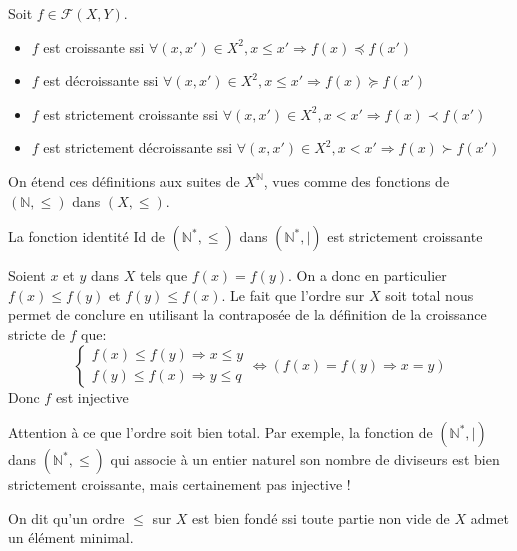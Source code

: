 \documentclass{scrartcl}
\begin{document}
			Soit $f \in \mathcal{F}(X,Y)$. 
			\begin{itemize}
				\item $f$ est croissante ssi $\forall (x,x') \in X^2, x \leq x' \Rightarrow f(x) \preceq f(x')$
				\item $f$ est décroissante ssi $\forall (x,x') \in X^2, x \leq x' \Rightarrow f(x) \succeq f(x')$
				\item $f$ est strictement croissante ssi $\forall (x,x') \in X^2, x < x' \Rightarrow f(x) \prec f(x')$
				\item $f$ est strictement décroissante ssi $\forall (x,x') \in X^2, x < x' \Rightarrow f(x) \succ f(x')$
			\end{itemize}

			\rem On étend ces définitions aux suites de $X^\mathbb{N}$, 
			vues comme des fonctions de $(\mathbb{N},\leq)$ dans $(X,\leq)$.

			\exemple La fonction identité Id de $(\mathbb{N}^*,\leq)$ dans $(\mathbb{N}^*,|)$ est strictement croissante
			
			\begin{demo}
				\item Soient $x$ et $y$ dans $X$ tels que $f(x) = f(y)$.
				On a donc en particulier $f(x) \leq f(y)$ et $f(y) \leq f(x)$. 
				Le fait que l'ordre sur $X$ soit total nous permet de conclure
				en utilisant la contraposée de la définition de la croissance stricte de $f$ que:
				\[
					\begin{cases}
						f(x) \leq f(y) \Rightarrow x \leq y \\
						f(y) \leq f(x) \Rightarrow y \leq q
					\end{cases}
					\Leftrightarrow \left(f(x) = f(y) \Rightarrow x=y \right)
				\]
				Donc $f$ est injective
			\end{demo}

			\rem Attention à ce que l'ordre soit bien total. 
				Par exemple, la fonction de $(\mathbb{N}^*,|)$ dans $(\mathbb{N}^*,\leq)$ 
				qui associe à un entier naturel son nombre de diviseurs est bien strictement croissante,
				mais certainement pas injective !

			On dit qu'un ordre $\leq$ sur $X$ est bien fondé ssi toute partie non vide de $X$ admet
			un élément minimal.
\end{document}
